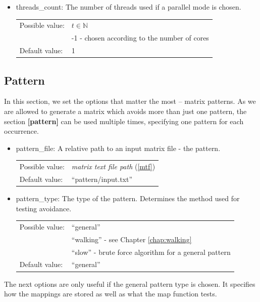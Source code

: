 \begin{itemize}
\item threads\_count: The number of threads used if a parallel mode is chosen.

\begin{tabular}{ll}
Possible value: & $t\in\mathbb{N}$ \\
& -1 - chosen according to the number of cores \\
Default value: & 1
\end{tabular}
\end{itemize}

\subsection{Pattern}
In this section, we set the options that matter the most -- matrix patterns. As we are allowed to generate a matrix which avoids more than just one pattern, the section \textbf{[pattern]} can be used multiple times, specifying one pattern for each occurrence.
\begin{itemize}
\item pattern\_file: A relative path to an input matrix file - the pattern.

\begin{tabular}{ll}
Possible value: & \textit{matrix text file path} (\ref{mtf}) \\
Default value: & ``pattern/input.txt''
\end{tabular}

\item pattern\_type: The type of the pattern. Determines the method used for testing avoidance.

\begin{tabular}{ll}
Possible value: & ``general'' \\
& ``walking'' - see Chapter \ref{chap:walking} \\
& ``slow'' - brute force algorithm for a general pattern \\
Default value: & ``general''
\end{tabular}
\end{itemize}

The next options are only useful if the general pattern type is chosen. It specifies how the mappings are stored as well as what the map function tests.

